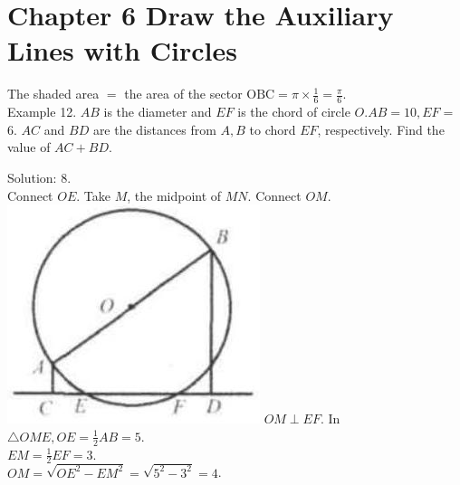 \documentclass[10pt]{article}
\begin{document}
\section*{Chapter 6 Draw the Auxiliary Lines with Circles}
The shaded area \(=\) the area of the sector \(\mathrm{OBC}=\pi \times \frac{1}{6}=\frac{\pi}{6}\).\\
Example 12. \(A B\) is the diameter and \(E F\) is the chord of circle \(O . A B=10, E F=\) 6. \(A C\) and \(B D\) are the distances from \(A, B\) to chord \(E F\), respectively. Find the value of \(A C+B D\).

Solution: 8.\\
Connect \(O E\). Take \(M\), the midpoint of \(M N\). Connect \(O M\).\\
\includegraphics[max width=\textwidth]{2025_04_17_97bc1f7e44d93c271a88g-152(3)} \(O M \perp E F\). In \(\triangle O M E, O E=\frac{1}{2} A B=5\).\\
\(E M=\frac{1}{2} E F=3\).\\
\(O M=\sqrt{O E^{2}-E M^{2}}=\sqrt{5^{2}-3^{2}}=4\).\\
\end{document}
